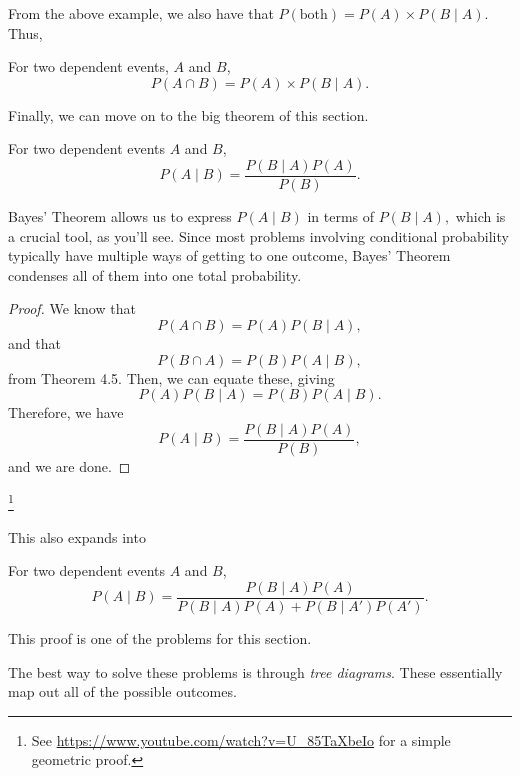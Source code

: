 \documentclass[11pt]{article}
\begin{document}
From the above example, we also have that $P(\text{both}) = P(A)\times P(B \mid A)$. Thus,
\begin{thrm}
    For two dependent events, $A$ and $B$,
    \[P(A \cap B) = P(A)\times P(B \mid A).\]
\end{thrm}
Finally, we can move on to the big theorem of this section.

\begin{thrm}
    For two dependent events $A$ and $B$,
    \[ P(A\mid B)={\frac {P(B\mid A)P(A)}{P(B)}}.\]
\end{thrm}
Bayes' Theorem allows us to express $P(A \mid B)$ in terms of $P(B \mid A),$ which is a crucial tool, as you'll see. Since most problems involving conditional probability typically have multiple ways of getting to one outcome, Bayes' Theorem condenses all of them into one total probability.

\medskip

\begin{proof}
    We know that
    \[P(A\cap B) = P(A)P(B\mid A),\]
    and that
    \[P(B\cap A) = P(B)P(A\mid B),\]
    from Theorem 4.5. Then, we can equate these, giving
    \[P(A)P(B\mid A) = P(B)P(A\mid B).\]
    Therefore, we have
    \[P(A\mid B)=\frac {P(B\mid A)P(A)}{P(B)},\]
    and we are done.
\end{proof}\footnote{See \url{https://www.youtube.com/watch?v=U_85TaXbeIo} for a simple geometric proof.}

\medskip

\noindent This also expands into

\begin{corr}
    For two dependent events $A$ and $B$,
    \[P(A\mid B)={\frac {P(B\mid A)P(A)}{P(B\mid A)P(A)+P(B\mid A')P(A')}}.\]
\end{corr}
This proof is one of the problems for this section.

The best way to solve these problems is through \textit{tree diagrams}. These essentially map out all of the possible outcomes.
\end{document}
